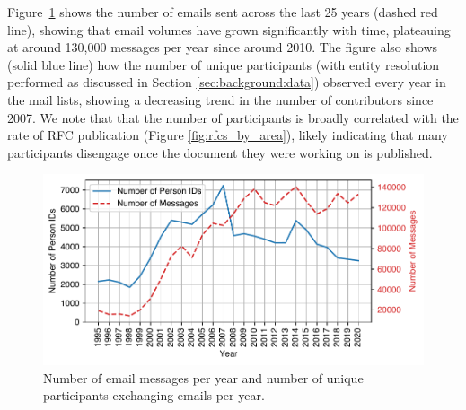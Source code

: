 \documentclass[twocolumn,10pt]{article}
\newlength{\figureWidthOneColumn}
\newcommand{\pb}[1]{\vspace{0.75ex}\noindent{\textbf{#1}}}
\begin{document}
\pb{Volume of Discussion:}
Figure~\ref{fig:pid_count_emailing_yearly} shows the number of emails sent
across the last 25 years (dashed red line), showing that email volumes have
grown significantly with time, plateauing at around 130,000 messages per
year since around 2010. The figure also shows (solid blue line) how the
number of unique participants (with entity resolution performed as
discussed in Section \ref{sec:background:data}) observed every year in the
mail lists, showing a decreasing trend in the number of contributors since
2007. We note that that the number of participants is broadly correlated
with the rate of RFC publication (Figure \ref{fig:rfcs_by_area}), likely
indicating that many participants disengage once the document they were
working on is published.

\begin{figure}
  \centering
  \includegraphics[width=\figureWidthOneColumn]{figures-prev/imc-2021/emails/pid_count_emailing_yearly.pdf}
  \caption{
    Number of email messages per year and number of unique participants
    exchanging emails per year.
  }
  \label{fig:pid_count_emailing_yearly}
\end{figure}
\end{document}
